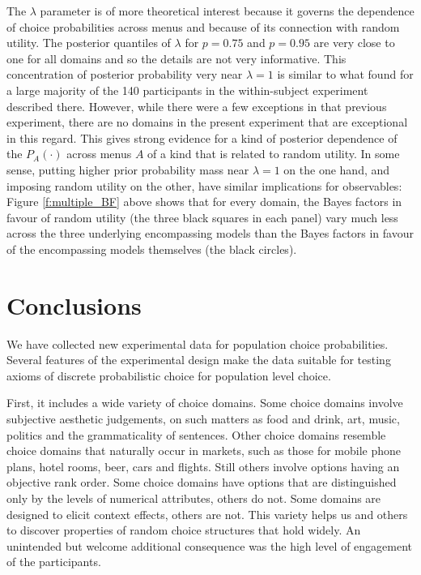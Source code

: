 \documentclass[11pt,letter]{article}
\newcommand{\menus}{menus}
\begin{document}
The $\lambda$ parameter is of more theoretical interest because it governs the dependence of choice probabilities across \menus{} and because of its connection with random utility.
The posterior quantiles of $\lambda$ for $p=0.75$ and $p=0.95$ are very close to one for all domains and so the details are not very informative.
This concentration of posterior probability very near $\lambda = 1$ is similar to what  found for a large majority of the 140 participants in the within-subject experiment described there.
However, while there were a few exceptions in that previous experiment, there are no domains in the present experiment that are exceptional in this regard.
This gives strong evidence for a kind of posterior dependence of the $P_A(\cdot)$ across \menus{} $A$ of a kind that is related to random utility.
In some sense, putting higher prior probability mass near $\lambda = 1$ on the one hand, and imposing random utility on the other, have similar implications for observables: Figure \ref{f:multiple_BF} above shows that for every domain, the Bayes factors in favour of random utility (the three black squares in each panel) vary much less across the three underlying encompassing models than the Bayes factors in favour of the encompassing models themselves (the black circles).

\section{Conclusions}\label{s:conclude}

We have collected new experimental data for population choice probabilities.
Several features of the experimental design make the data suitable for testing axioms of discrete probabilistic choice for population level choice.

First, it includes a wide variety of choice domains.
Some choice domains involve subjective aesthetic judgements, on such matters as food and drink, art, music, politics and the grammaticality of sentences.
Other choice domains resemble choice domains that naturally occur in markets, such as those for mobile phone plans, hotel rooms, beer, cars and flights.
Still others involve options having an objective rank order.
Some choice domains have options that are distinguished only by the levels of numerical attributes, others do not.
Some domains are designed to elicit context effects, others are not.
This variety helps us and others to discover properties of random choice structures that hold widely.
An unintended but welcome additional consequence was the high level of engagement of the participants.
\end{document}
